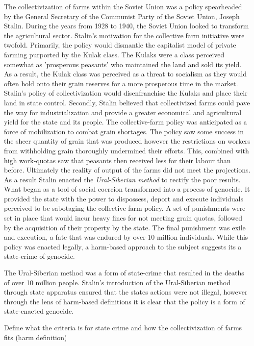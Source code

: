 \documentclass[11pt, a4paper,]{scrartcl}
\begin{document}
The collectivization of farms within the Soviet Union was a policy spearheaded by the General Secretary of the Communist Party of the Soviet Union, Joseph Stalin. During the years from 1928 to 1940, the Soviet Union looked to transform the agricultural sector. Stalin's motivation for the collective farm initiative were twofold. Primarily, the policy would dismantle the capitalist model of private farming purported by the Kulak class. The Kulaks were a class perceived somewhat as 'prosperous peasants' who maintained the land and sold its yield. As a result, the Kulak class was perceived as a threat to socialism as they would often hold onto their grain reserves for a more prosperous time in the market. Stalin's policy of collectivization would disenfranchise the Kulaks and place their land in state control. Secondly, Stalin believed that collectivized farms could pave the way for industrialization and provide a greater economical and agricultural yield for the state and its people. The collective-farm policy was anticipated as a force of mobilization to combat grain shortages. The policy saw some success in the sheer quantity of grain that was produced however the restrictions on workers from withholding grain thoroughly undermined their efforts. This, combined with high work-quotas saw that peasants then received less for their labour than before. Ultimately the reality of output of the farms did not meet the projections. As a result Stalin enacted the \textit{Ural-Siberian method} to rectify the poor results. What began as a tool of social coercion transformed into a process of genocide. It provided the state with the power to dispossess, deport and execute \cite{Hughes, 1994} individuals perceived to be sabotaging the collective farm policy. A set of punishments were set in place that would incur heavy fines for not meeting grain quotas, followed by the acquisition of their property by the state. The final punishment was exile and execution, a fate that was endured by over 10 million individuals. While this policy was enacted legally, a harm-based approach to the subject suggests its a state-crime of genocide.
\par
The Ural-Siberian method was a form of state-crime that resulted in the deaths of over 10 million people. Stalin's introduction of the Ural-Siberian method through state apparatus ensured that the states actions were not illegal, however through the lens of harm-based definitions it is clear that the policy is a form of state-enacted genocide. 


Define what the criteria is for state crime and how the collectivization of farms fits (harm definition) \par
\end{document}
